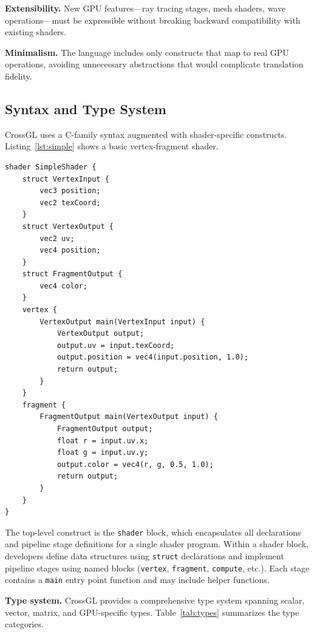 \documentclass{svproc}
\begin{document}
\textbf{Extensibility.} New GPU features---ray tracing stages, mesh shaders, wave operations---must be expressible without breaking backward compatibility with existing shaders.

\textbf{Minimalism.} The language includes only constructs that map to real GPU operations, avoiding unnecessary abstractions that would complicate translation fidelity.

\subsection{Syntax and Type System}

CrossGL uses a C-family syntax augmented with shader-specific constructs. Listing~\ref{lst:simple} shows a basic vertex-fragment shader.

\begin{lstlisting}[language=CrossGL, caption={A simple CrossGL vertex-fragment shader}, label={lst:simple}]
shader SimpleShader {
    struct VertexInput {
        vec3 position;
        vec2 texCoord;
    }
    struct VertexOutput {
        vec2 uv;
        vec4 position;
    }
    struct FragmentOutput {
        vec4 color;
    }
    vertex {
        VertexOutput main(VertexInput input) {
            VertexOutput output;
            output.uv = input.texCoord;
            output.position = vec4(input.position, 1.0);
            return output;
        }
    }
    fragment {
        FragmentOutput main(VertexOutput input) {
            FragmentOutput output;
            float r = input.uv.x;
            float g = input.uv.y;
            output.color = vec4(r, g, 0.5, 1.0);
            return output;
        }
    }
}
\end{lstlisting}

The top-level construct is the \texttt{shader} block, which encapsulates all declarations and pipeline stage definitions for a single shader program. Within a shader block, developers define data structures using \texttt{struct} declarations and implement pipeline stages using named blocks (\texttt{vertex}, \texttt{fragment}, \texttt{compute}, etc.). Each stage contains a \texttt{main} entry point function and may include helper functions.

\textbf{Type system.} CrossGL provides a comprehensive type system spanning scalar, vector, matrix, and GPU-specific types. Table~\ref{tab:types} summarizes the type categories.
\end{document}
